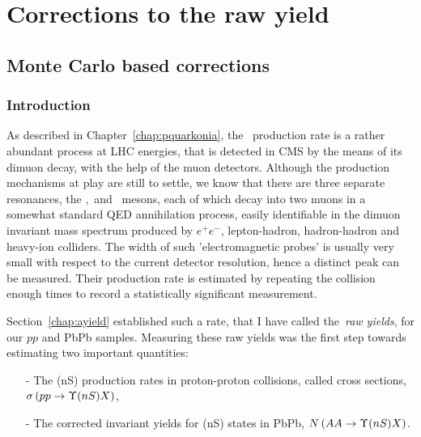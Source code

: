 \chapter{Corrections to the raw yield}
\label{chap:aCorrection}
\minitoc
{}



\section{Monte Carlo based corrections}
\subsection{Introduction}
As described in Chapter~\ref{chap:pquarkonia}, the \PgU\ production
rate is a rather abundant process at LHC energies, that is detected in CMS by the
means of its dimuon decay, with the help of the muon detectors. Although
the production mechanisms at play are still to settle, we know that
there are three separate resonances, the \PgUa,\PgUb\ and \PgUc\
mesons, each of which decay into two muons in a somewhat standard
QED annihilation process, easily identifiable in the dimuon invariant
mass spectrum produced by $e^{+}e^{-}$, lepton-hadron, hadron-hadron and heavy-ion colliders. The width
of such 'electromagnetic probes' is usually very small with respect to
the current detector resolution, hence a distinct peak can be
measured. Their production rate is estimated by repeating the collision enough
times to record a statistically significant measurement. 

Section~\ref{chap:ayield} established such a rate, that I have called
the~\textit{raw yields}, for our $pp$ and PbPb
samples. Measuring these raw yields was the first step towards estimating two important quantities:
\begin{itemize}
\item[-] The \PgU(nS) production rates in proton-proton collisions, called cross sections, $\sigma\left( pp\rightarrow
\Upsilon(nS)X\right)$,
\item[-] The corrected invariant yields for \PgU(nS) states in PbPb, $N\left( AA\rightarrow
 \Upsilon(nS)X\right)$.
\end{itemize}

